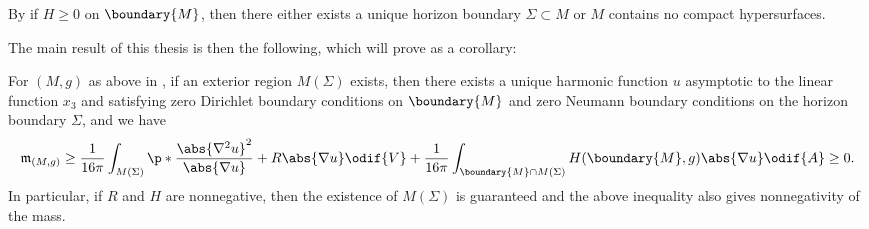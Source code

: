 \documentclass[titlepage,numbers=noenddot,headinclude,oneside,%
footinclude=true,cleardoublepage=empty,%
BCOR=5mm,paper=a4,fontsize=11pt,%
english,%
]{scrartcl}
\newcommand{\mass}[2]{\mathfrak{m}_{(#1,#2)}} %
\begin{document}
\begin{remark}
    By \cite[Lemma 2.3]{koerberRiemannianPenroseInequality2020} if \( H\geq 0 \) on \( \boundary{M} \), then there either exists a unique horizon boundary \( \Sigma\subset M \) or \( M \) contains no compact hypersurfaces.
\end{remark}
The main result of this thesis is then the following, which will prove  as a corollary:
\begin{theorem}\label{thm:main_result}
    For \( (M,g) \) as above in , if an exterior region \( M(\Sigma) \) exists, then
    there exists a unique harmonic function \( u \) asymptotic to the linear function \( x_3 \) and satisfying zero Dirichlet boundary conditions on \( \boundary{M} \) and zero Neumann boundary conditions on the horizon boundary \( \Sigma \), and we have
    \begin{equation*}
        \mass{M}{g}\geq \frac{1}{16\pi}\int_{M(\Sigma)}\p*{\frac{\abs{\nabla^2 u}^2}{\abs{\nabla u}}+R\abs{\nabla u}}\odif{V}+\frac{1}{16\pi}\int_{\boundary{M}\cap M(\Sigma)}H(\boundary{M},g)\abs{\nabla u}\odif{A}\geq 0.
    \end{equation*} 
    In particular, if \( R \) and \( H \) are nonnegative, then the existence of \( M(\Sigma) \) is guaranteed and the above inequality also gives nonnegativity of the mass.
\end{theorem} 

\end{document}
